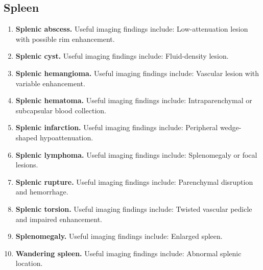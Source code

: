 \subsection{Spleen}
\begin{enumerate}[leftmargin=*,itemsep=0.45em,topsep=0.4em]
\item \textbf{Splenic abscess.} Useful imaging findings include: Low-attenuation lesion with possible rim enhancement.
\item \textbf{Splenic cyst.} Useful imaging findings include: Fluid-density lesion.
\item \textbf{Splenic hemangioma.} Useful imaging findings include: Vascular lesion with variable enhancement.
\item \textbf{Splenic hematoma.} Useful imaging findings include: Intraparenchymal or subcapsular blood collection.
\item \textbf{Splenic infarction.} Useful imaging findings include: Peripheral wedge-shaped hypoattenuation.
\item \textbf{Splenic lymphoma.} Useful imaging findings include: Splenomegaly or focal lesions.
\item \textbf{Splenic rupture.} Useful imaging findings include: Parenchymal disruption and hemorrhage.
\item \textbf{Splenic torsion.} Useful imaging findings include: Twisted vascular pedicle and impaired enhancement.
\item \textbf{Splenomegaly.} Useful imaging findings include: Enlarged spleen.
\item \textbf{Wandering spleen.} Useful imaging findings include: Abnormal splenic location.
\end{enumerate}

